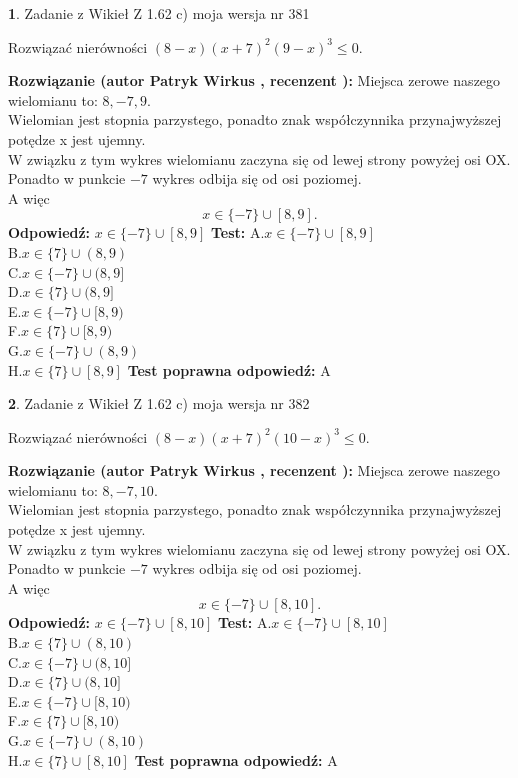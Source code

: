 \documentclass[12pt, a4paper]{article}
\theoremstyle{definition} %
\newtheorem{zad}{}
\newcommand{\zadStart}[1]{\begin{zad}#1\newline}
\newcommand{\zadStop}{\end{zad}}
\newcommand{\rozwStart}[2]{\noindent \textbf{Rozwiązanie (autor #1 , recenzent #2): }\newline}
\newcommand{\rozwStop}{\newline}
\newcommand{\odpStart}{\noindent \textbf{Odpowiedź:}\newline}
\newcommand{\odpStop}{\newline}
\newcommand{\testStart}{\noindent \textbf{Test:}\newline}
\newcommand{\testStop}{\newline}
\newcommand{\kluczStart}{\noindent \textbf{Test poprawna odpowiedź:}\newline}
\newcommand{\kluczStop}{\newline}
\begin{document}
\zadStart{Zadanie z Wikieł Z 1.62 c) moja wersja nr 381}

Rozwiązać nierówności $(8-x)(x+7)^{2}(9-x)^{3}\le0$.
\zadStop
\rozwStart{Patryk Wirkus}{}
Miejsca zerowe naszego wielomianu to: $8, -7, 9$.\\
Wielomian jest stopnia parzystego, ponadto znak współczynnika przy\linebreak najwyższej potędze x jest ujemny.\\ W związku z tym wykres wielomianu zaczyna się od lewej strony powyżej osi OX.\\
Ponadto w punkcie $-7$ wykres odbija się od osi poziomej.\\
A więc $$x \in \{-7\} \cup [8,9].$$
\rozwStop
\odpStart
$x \in \{-7\} \cup [8,9]$
\odpStop
\testStart
A.$x \in \{-7\} \cup [8,9]$\\
B.$x \in \{7\} \cup (8,9)$\\
C.$x \in \{-7\} \cup (8,9]$\\
D.$x \in \{7\} \cup (8,9]$\\
E.$x \in \{-7\} \cup [8,9)$\\
F.$x \in \{7\} \cup [8,9)$\\
G.$x \in \{-7\} \cup (8,9)$\\
H.$x \in \{7\} \cup [8,9]$
\testStop
\kluczStart
A
\kluczStop



\zadStart{Zadanie z Wikieł Z 1.62 c) moja wersja nr 382}

Rozwiązać nierówności $(8-x)(x+7)^{2}(10-x)^{3}\le0$.
\zadStop
\rozwStart{Patryk Wirkus}{}
Miejsca zerowe naszego wielomianu to: $8, -7, 10$.\\
Wielomian jest stopnia parzystego, ponadto znak współczynnika przy\linebreak najwyższej potędze x jest ujemny.\\ W związku z tym wykres wielomianu zaczyna się od lewej strony powyżej osi OX.\\
Ponadto w punkcie $-7$ wykres odbija się od osi poziomej.\\
A więc $$x \in \{-7\} \cup [8,10].$$
\rozwStop
\odpStart
$x \in \{-7\} \cup [8,10]$
\odpStop
\testStart
A.$x \in \{-7\} \cup [8,10]$\\
B.$x \in \{7\} \cup (8,10)$\\
C.$x \in \{-7\} \cup (8,10]$\\
D.$x \in \{7\} \cup (8,10]$\\
E.$x \in \{-7\} \cup [8,10)$\\
F.$x \in \{7\} \cup [8,10)$\\
G.$x \in \{-7\} \cup (8,10)$\\
H.$x \in \{7\} \cup [8,10]$
\testStop
\kluczStart
A
\kluczStop
\end{document}
